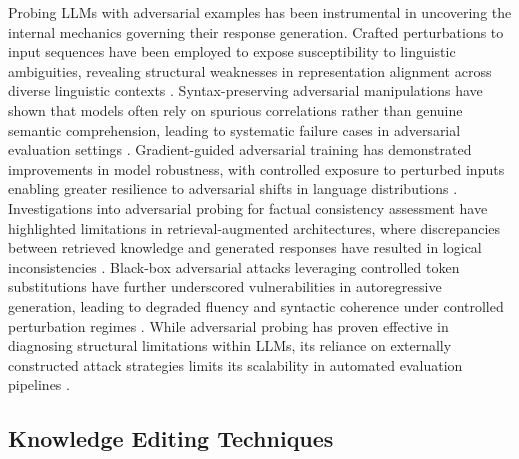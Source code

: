 Probing LLMs with adversarial examples has been instrumental in uncovering the internal mechanics governing their response generation. Crafted perturbations to input sequences have been employed to expose susceptibility to linguistic ambiguities, revealing structural weaknesses in representation alignment across diverse linguistic contexts \cite{laurent2024optimizing}. Syntax-preserving adversarial manipulations have shown that models often rely on spurious correlations rather than genuine semantic comprehension, leading to systematic failure cases in adversarial evaluation settings \cite{anvito2024enhancing}. Gradient-guided adversarial training has demonstrated improvements in model robustness, with controlled exposure to perturbed inputs enabling greater resilience to adversarial shifts in language distributions \cite{geline2024linguistic}. Investigations into adversarial probing for factual consistency assessment have highlighted limitations in retrieval-augmented architectures, where discrepancies between retrieved knowledge and generated responses have resulted in logical inconsistencies \cite{mcintosh2024inadequacy}. Black-box adversarial attacks leveraging controlled token substitutions have further underscored vulnerabilities in autoregressive generation, leading to degraded fluency and syntactic coherence under controlled perturbation regimes \cite{sang2024evaluating}. While adversarial probing has proven effective in diagnosing structural limitations within LLMs, its reliance on externally constructed attack strategies limits its scalability in automated evaluation pipelines \cite{kirchenbauer2024hallucination}.

\subsection{Knowledge Editing Techniques}

